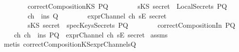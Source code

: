 \begin{isabellebody}
\ \ \ \ \ \ \ \ {\isachardoublequoteopen}correctCompositionKS\ PQ{\isachardoublequoteclose}\isanewline
\ \ \ \ \ \ \ \ {\isachardoublequoteopen}sKS\ secret\ {\isasymnotin}\ LocalSecrets\ PQ{\isachardoublequoteclose}\isanewline
\ \ \ \ \ \ \ \ {\isachardoublequoteopen}ch\ {\isasymin}\ ins\ Q{\isachardoublequoteclose}\isanewline
\ \ \ \ \ \ \ \ {\isachardoublequoteopen}exprChannel\ ch\ {\isacharparenleft}sE\ secret{\isacharparenright}{\isachardoublequoteclose}\isanewline
\ \ \ \ \ \ \ \ {\isachardoublequoteopen}sKS\ secret\ {\isasymnotin}\ specKeysSecrets\ PQ{\isachardoublequoteclose}\isanewline
\ \ \ \ \ \ \ \ {\isachardoublequoteopen}correctCompositionIn\ PQ{\isachardoublequoteclose}\isanewline
{}\ \ \ \ {\isachardoublequoteopen}{\isasymexists}ch{\isachardot}\ ch\ {\isasymin}\ ins\ PQ\ {\isasymand}\ exprChannel\ ch\ {\isacharparenleft}sE\ secret{\isacharparenright}{\isachardoublequoteclose}\isanewline
%
\isadelimproof
%
\endisadelimproof
%
\isatagproof
{}\isamarkupfalse%
\ assms\isanewline
{}\isamarkupfalse%
\ {\isacharparenleft}metis\ correctCompositionKS{\isacharunderscore}exprChannel{\isacharunderscore}s{\isacharunderscore}Q{\isacharparenright}%
\endisatagproof
{\isafoldproof}%
%
\isadelimproof
\isanewline
%
\endisadelimproof
%
\isadelimtheory
\isanewline
%
\endisadelimtheory
%
\isatagtheory
{}\isamarkupfalse%
%
\endisatagtheory
{\isafoldtheory}%
%
\isadelimtheory
%
\endisadelimtheory
\end{isabellebody}%
